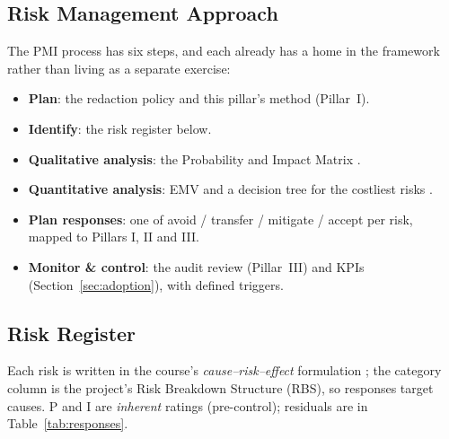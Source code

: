 \documentclass[12pt,a4paper]{article}
\begin{document}
\subsection{Risk Management Approach}

The PMI process has six steps, and each already has a home in the framework rather than living as a separate exercise:

\begin{itemize}
  \item \textbf{Plan}: the redaction policy and this pillar's method (Pillar~I).
  \item \textbf{Identify}: the risk register below.
  \item \textbf{Qualitative analysis}: the Probability and Impact Matrix \cite{falchi_slides}.
  \item \textbf{Quantitative analysis}: EMV and a decision tree for the costliest risks \cite{falchi_slides}.
  \item \textbf{Plan responses}: one of avoid / transfer / mitigate / accept per risk, mapped to Pillars I, II and III.
  \item \textbf{Monitor \& control}: the audit review (Pillar~III) and KPIs (Section~\ref{sec:adoption}), with defined triggers.
\end{itemize}

\subsection{Risk Register}

Each risk is written in the course's \emph{cause--risk--effect} formulation \cite{falchi_slides}; the category column is the project's Risk Breakdown Structure (RBS), so responses target causes. P and I are \emph{inherent} ratings (pre-control); residuals are in Table~\ref{tab:responses}.
\end{document}
